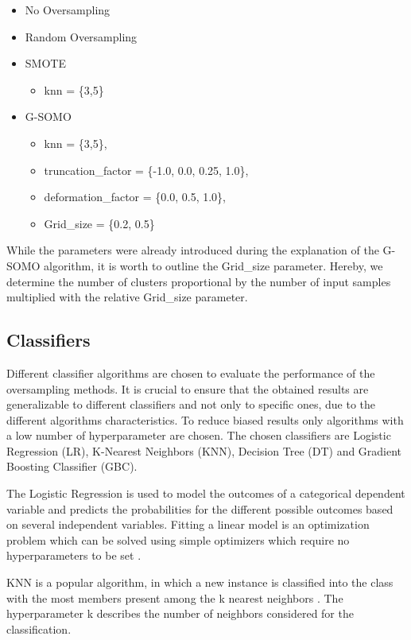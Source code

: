 \documentclass[parskip=full]{scrartcl}
\begin{document}
\begin{itemize}
  \item No Oversampling
  \item Random Oversampling 
  \item SMOTE 
    \begin{itemize}
 \item knn = \{3,5\}
 \end{itemize}
  \item G-SOMO 
  \begin{itemize}
 \item knn = \{3,5\},
 \item truncation\_factor = \{-1.0, 0.0, 0.25, 1.0\},
 \item deformation\_factor = \{0.0, 0.5, 1.0\},
 \item Grid\_size = \{0.2, 0.5\}
 \end{itemize}
\end{itemize}

While the parameters were already introduced during the explanation of the G-SOMO algorithm, it is 
worth to outline the Grid\_size parameter. Hereby, we determine the number of clusters proportional 
by the number of input samples multiplied with the relative Grid\_size parameter.

\subsection{Classifiers}

Different classifier algorithms are chosen to evaluate the performance of the oversampling methods. 
It is crucial to ensure that the obtained results are generalizable to different classifiers and not 
only to specific ones, due to the different algorithms characteristics. To reduce biased results only
 algorithms with a low number of hyperparameter are chosen. The chosen classifiers are Logistic 
 Regression (LR), K-Nearest Neighbors (KNN), Decision Tree (DT) and Gradient Boosting Classifier (GBC).

The Logistic Regression is used to model the outcomes of a categorical dependent variable and 
predicts the probabilities for the different possible outcomes based on several independent 
variables. Fitting a linear model is an optimization problem which can be solved using simple 
optimizers which require no hyperparameters to be set \cite{McCullagh1984}.

KNN is a popular algorithm, in which a new instance is classified into the class with the most 
members present among the k nearest neighbors \cite{Suguna2010}. The hyperparameter k describes 
the number of neighbors considered for the classification.
\end{document}
